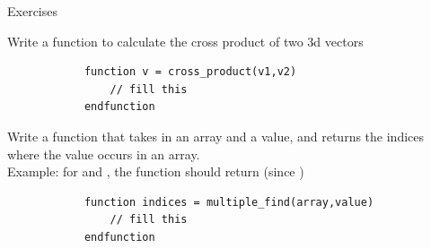 \begin{frame}[fragile]{Exercises}
    \small
    \vspace{-1em}
    \begin{exercise}
        Write a function to calculate the cross product of two 3d vectors
        \begin{lstlisting}
            function v = cross_product(v1,v2)
                // fill this
            endfunction
        \end{lstlisting}
    \end{exercise}
    \begin{exercise}
        Write a function that takes in an array and a value, and returns the indices where the value occurs in an array.\\
        Example: for  and , the function should return \inlinecode{[2,6]} (since )
        \begin{lstlisting}
            function indices = multiple_find(array,value)
                // fill this
            endfunction
        \end{lstlisting}
    \end{exercise}
\end{frame}

